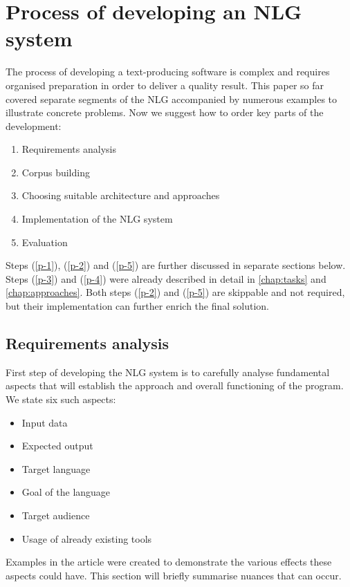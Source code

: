 \chapter{Process of developing an NLG system}\label{chap:process}

The process of developing a text-producing software is complex and requires organised preparation in order to deliver a quality result. This paper so far covered separate segments of the NLG accompanied by numerous examples to illustrate concrete problems. Now we suggest how to order key parts of the development:
\begin{enumerate}
	\item Requirements analysis \label{p-1}
	\item Corpus building \label{p-2}
	\item Choosing suitable architecture and approaches \label{p-3}
	\item Implementation of the NLG system \label{p-4}
	\item Evaluation \label{p-5}
\end{enumerate}

Steps (\ref{p-1}), (\ref{p-2}) and (\ref{p-5}) are further discussed in separate sections below. Steps (\ref{p-3}) and (\ref{p-4}) were already described in detail in \autoref{chap:tasks} and \autoref{chap:approaches}. Both steps (\ref{p-2}) and (\ref{p-5}) are skippable and not required, but their implementation can further enrich the final solution.

\section{Requirements analysis}

First step of developing the NLG system is to carefully analyse fundamental aspects that will establish the approach and overall functioning of the program. We state six such aspects:
\begin{itemize}
	\item Input data
	\item Expected output
	\item Target language
	\item Goal of the language 
	\item Target audience
	\item Usage of already existing tools  
\end{itemize}

Examples in the article were created to demonstrate the various effects these aspects could have. This section will briefly summarise nuances that can occur. 

